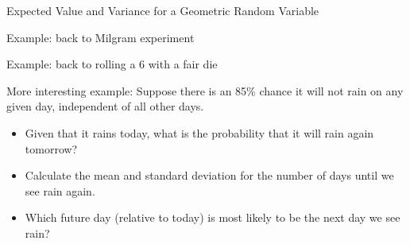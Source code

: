 \documentclass[11pt,letterpaper,twoside]{article}
\begin{document}
Expected Value and Variance for a Geometric Random Variable \vspace{240pt}

Example: back to Milgram experiment \vspace{120pt}

Example: back to rolling a 6 with a fair die

\newpage

More interesting example: Suppose there is an 85\% chance it will not rain on any given day, independent of all other days. 

\begin{itemize}

\item Given that it rains today, what is the probability that it will rain again tomorrow? \vspace{60pt}

\item Calculate the mean and standard deviation for the number of days until we see rain again. \vspace{120pt}

\item Which future day (relative to today) is most likely to be the next day we see rain?

\end{itemize}

\label{totalpag}
\end{document}
